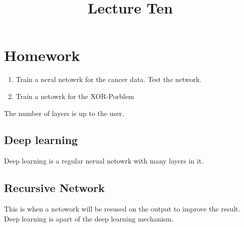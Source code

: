 \documentclass[letterpaper, 9pt]{article}
\title{Lecture Ten}
\begin{document}
\maketitle

\section{Homework}

\begin{enumerate}
\item Train a neral netowrk for the cancer data. Test the network.
\item Train a netowrk for the XOR-Porblem
\end{enumerate}

The number of layers is up to the user.

\subsection{Deep learning}
Deep learning is a regular nerual netowrk with many layers in it.

\subsection{Recursive Network}

This is when a netowork will be resused on the output to improve the result. Deep learning is apart of the deep learning mechanism.
\end{document}
